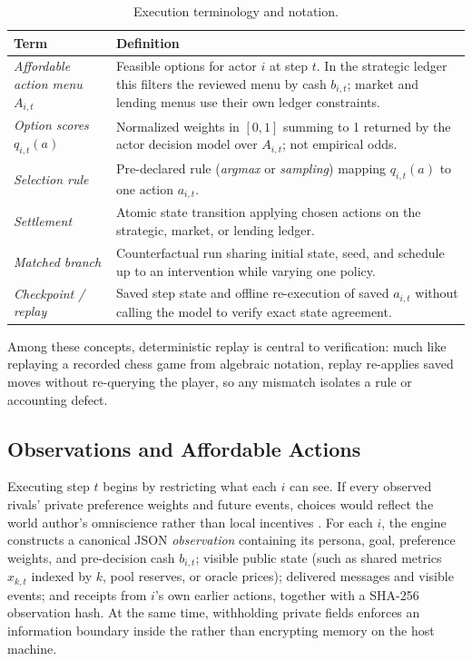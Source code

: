 \begin{table}[H]
\caption{Execution terminology and notation.}
\label{tab:execution-terms}
\centering\small
\renewcommand{\arraystretch}{1.12}
\begin{tabularx}{\columnwidth}{@{}>{\raggedright\arraybackslash}p{}Y@{}}
\toprule
Term & Definition \\
\midrule
\textit{Affordable action menu} $A_{i,t}$ & Feasible options for actor $i$ at step $t$. In the strategic ledger this filters the reviewed menu by cash $b_{i,t}$; market and lending menus use their own ledger constraints. \\
\textit{Option scores} $q_{i,t}(a)$ & Normalized weights in $[0,1]$ summing to 1 returned by the actor decision model over $A_{i,t}$; not empirical odds. \\
\textit{Selection rule} & Pre-declared rule (\textit{argmax} or \textit{sampling}) mapping $q_{i,t}(a)$ to one action $a_{i,t}$. \\
\textit{Settlement} & Atomic state transition applying chosen actions on the strategic, market, or lending ledger. \\
\textit{Matched branch} & Counterfactual run sharing initial state, seed, and schedule up to an intervention while varying one policy. \\
\textit{Checkpoint / replay} & Saved step state and offline re-execution of saved $a_{i,t}$ without calling the model to verify exact state agreement. \\
\bottomrule
\end{tabularx}
\end{table}

Among these concepts, deterministic replay is central to verification:
much like replaying a recorded chess game from algebraic notation, replay
re-applies saved moves without re-querying the player, so any mismatch isolates
a rule or accounting defect.

\subsection{ Observations and Affordable Actions}
Executing step $t$ begins by restricting what each  $i$  can see. If
every  observed rivals' private preference weights and future
events, choices would reflect the world author's omniscience rather than local
incentives . For each  $i$, the engine constructs a canonical JSON
\textit{observation} containing its persona, goal, preference weights, and
pre-decision cash $b_{i,t}$; visible public state (such as shared metrics
$x_{k,t}$ indexed by $k$, pool reserves, or oracle prices); delivered
 messages and visible events; and receipts from  $i$'s own
earlier actions, together with a SHA-256 observation hash. At the same
time, withholding private fields enforces an information boundary inside the
 rather than encrypting memory on the host machine.

